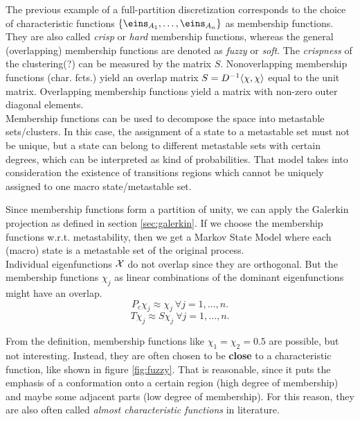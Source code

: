 The previous example of a full-partition discretization corresponds to the choice of characteristic functions $\{ \eins_{A_1},\dots, \eins_{A_n} \}$ as membership functions. They are also called \textit{crisp} or \textit{hard} membership functions, whereas the general (overlapping) membership functions are denoted as \textit{fuzzy} or \textit{soft}.
The \textit{crispness} of the clustering(?) can be measured by the matrix $S$.
Nonoverlapping membership functions (char. fcts.) yield an overlap matrix $S = D^{-1} \langle \chi, \chi \rangle$ equal to the unit matrix.
Overlapping membership functions yield a matrix with non-zero outer diagonal elements.
\\

Membership functions can be used to decompose the space into metastable sets/clusters. In this case, the assignment of a state to a metastable set must not be unique, but a state can belong to different metastable sets with certain degrees, which can be interpreted as kind of probabilities.  That model takes into consideration
the existence of transitions regions which cannot be uniquely assigned to one macro state/metastable set.


Since membership functions form a partition of unity, we can apply the Galerkin projection as defined in section \ref{sec:galerkin}.
If we choose the membership functions w.r.t. metastability, then we get a Markov State Model where each (macro) state is a metastable set of the original process. 
\\

Individual eigenfunctions $\mathcal{X}$ do not overlap since they are orthogonal. But the membership functions $\chi_j$ as linear combinations of the dominant eigenfunctions might have an overlap.
\begin{equation*}
P_c \chi_j \approx \chi_j \ \forall j=1,\dots,n.
\end{equation*}
\begin{equation*}
T\chi_j \approx S\chi_j \ \forall j=1,\dots,n.
\end{equation*}

From the definition, membership functions like $\chi_1 = \chi_2 = 0.5$ are possible, but not interesting. Instead, they are often chosen to be \textbf{close} to a characteristic function, like shown in figure \ref{fig:fuzzy}. That is reasonable, since it puts the emphasis of a conformation onto a certain region (high degree of membership) and maybe some adjacent parts (low degree of membership).
For this reason, they are also often called \textit{almost characteristic functions} in literature.

